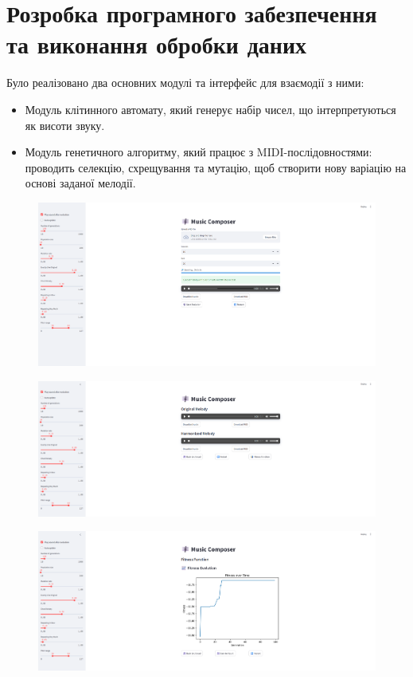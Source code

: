 \documentclass{article}
\begin{document}
    \section{Розробка програмного забезпечення та виконання обробки даних}
        Було реалізовано два основних модулі та інтерфейс для взаємодії з ними:
        \begin{itemize}
            \item Модуль клітинного автомату, який генерує набір чисел, що інтерпретуються як висоти звуку.
            \item Модуль генетичного алгоритму, який працює з MIDI-послідовностями: проводить селекцію, схрещування та мутацію, щоб створити нову варіацію на основі заданої мелодії.
        \end{itemize}
        \begin{figure}[h!]
            \centering
            \includegraphics[width=0.9\linewidth]{upload.png}
        \end{figure}
        \begin{figure}[h!]
            \centering
            \includegraphics[width=0.9\linewidth]{results.png}
        \end{figure}
        \begin{figure}[h!]
            \centering
            \includegraphics[width=0.9\linewidth]{fitness.png}
        \end{figure}
\end{document}
